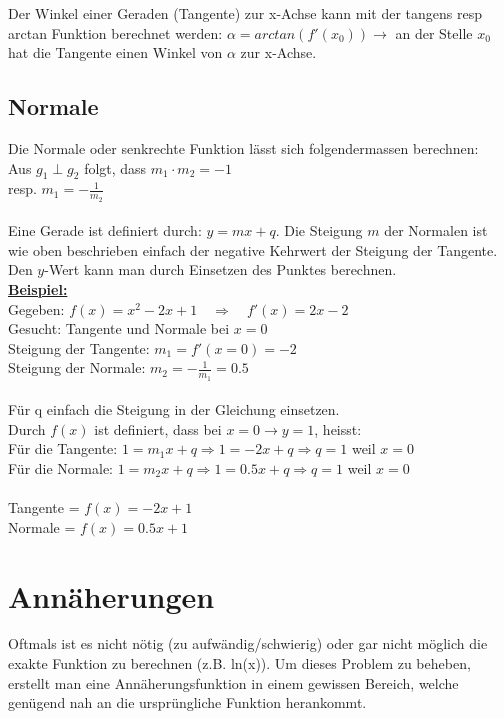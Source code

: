 \documentclass[12pt]{scrartcl}
\begin{document}
\noindent
Der Winkel einer Geraden (Tangente) zur x-Achse kann mit der tangens resp arctan 
Funktion berechnet werden: $\alpha = arctan(f'(x_0)) \rightarrow$ an der Stelle 
$x_0$ hat die Tangente einen Winkel von $\alpha$ zur x-Achse.


\subsection{Normale}
Die Normale oder senkrechte Funktion lässt sich folgendermassen berechnen:\\
Aus  $g_1 \perp g_2  $ folgt, dass $m_1 \cdot m_2 = -1$ \\ 
resp. $m_1 = -\frac{1}{m_2}$ \\
\\ 
\noindent
Eine Gerade ist definiert durch: $y = mx + q$. Die Steigung $m$ der Normalen ist wie oben
beschrieben einfach der negative Kehrwert der Steigung der Tangente. Den $y$-Wert 
kann man durch Einsetzen des Punktes berechnen. \\

\noindent
\underline{\textbf{Beispiel:}} \\
Gegeben: $f(x) = x^2 -2x + 1 \quad \Rightarrow \quad f'(x) = 2x -2$\\
Gesucht: Tangente und Normale bei $x=0$\\
Steigung der Tangente: $m_1 = f'(x=0) = -2$ \\
Steigung der Normale: $m_2 = -\frac{1}{m_1} = 0.5$ \\
\\
Für q einfach die Steigung in der Gleichung einsetzen.\\
Durch $f(x)$ ist definiert, dass bei $x=0 \rightarrow y=1$, heisst:\\
Für die Tangente: $1 = m_1x + q \Rightarrow 1= -2x + q \Rightarrow q = 1$ weil $x=0$\\
Für die Normale: $1 = m_2x + q \Rightarrow 1= 0.5x + q \Rightarrow q = 1$ weil $x=0$\\
\\
\noindent
Tangente = \underline{$f(x) = -2x + 1$}\\
Normale = \underline{$f(x) = 0.5x + 1$}\\

\newpage
\section{Annäherungen} \label{approximation}
Oftmals ist es nicht nötig (zu aufwändig/schwierig) oder gar nicht möglich die exakte 
Funktion zu berechnen (z.B. ln(x)). Um dieses Problem zu beheben, erstellt man eine Annäherungsfunktion
in einem gewissen Bereich, welche genügend nah an die ursprüngliche Funktion herankommt.
\end{document}
